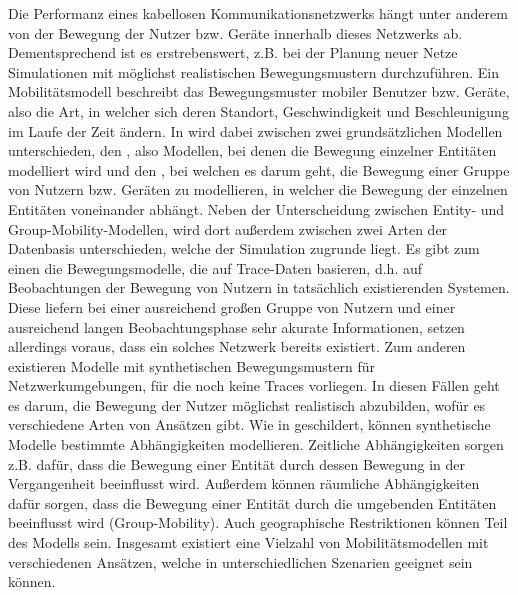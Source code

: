 \documentclass[12pt, a4paper]{article}
\begin{document}
Die Performanz eines kabellosen Kommunikationsnetzwerks hängt unter anderem von der Bewegung 
der Nutzer bzw. Geräte innerhalb dieses Netzwerks ab. Dementsprechend ist es erstrebenswert,
z.B. bei der Planung neuer Netze Simulationen mit möglichst realistischen Bewegungsmustern durchzuführen.
Ein Mobilitätsmodell beschreibt das Bewegungsmuster mobiler Benutzer bzw. Geräte,
also die Art, in welcher sich deren Standort, Geschwindigkeit und Beschleunigung im Laufe der Zeit ändern. \cite{Camp2002}
In \cite{Camp2002} wird dabei zwischen zwei grundsätzlichen Modellen unterschieden, den ,
also Modellen, bei denen die Bewegung einzelner Entitäten modelliert wird und den ,
bei welchen es darum geht, die Bewegung einer Gruppe von Nutzern bzw. Geräten zu modellieren,
in welcher die Bewegung der einzelnen Entitäten voneinander abhängt.
Neben der Unterscheidung zwischen Entity- und Group-Mobility-Modellen, wird dort außerdem zwischen zwei Arten der Datenbasis unterschieden,
welche der Simulation zugrunde liegt. Es gibt zum einen die Bewegungsmodelle, die auf Trace-Daten basieren, d.h. auf Beobachtungen
der Bewegung von Nutzern in tatsächlich existierenden Systemen. Diese liefern bei einer ausreichend großen Gruppe von Nutzern
und einer ausreichend langen Beobachtungsphase sehr akurate Informationen, setzen allerdings voraus, dass ein solches Netzwerk
bereits existiert. \cite{Camp2002} Zum anderen existieren Modelle mit synthetischen Bewegungsmustern für Netzwerkumgebungen, 
für die noch keine Traces vorliegen. In diesen Fällen geht es darum, die Bewegung der Nutzer möglichst realistisch abzubilden,
wofür es verschiedene Arten von Ansätzen gibt.
Wie in \cite{Aschenbruck2011} geschildert, können synthetische Modelle bestimmte Abhängigkeiten modellieren.
Zeitliche Abhängigkeiten sorgen z.B. dafür, dass die Bewegung einer Entität durch dessen Bewegung in der Vergangenheit
beeinflusst wird. Außerdem können räumliche Abhängigkeiten dafür sorgen, dass die Bewegung einer Entität durch die umgebenden 
Entitäten beeinflusst wird (Group-Mobility). Auch geographische Restriktionen können Teil des Modells sein.
Insgesamt existiert eine Vielzahl von Mobilitätsmodellen mit verschiedenen Ansätzen, 
welche in unterschiedlichen Szenarien geeignet sein können.
\end{document}
